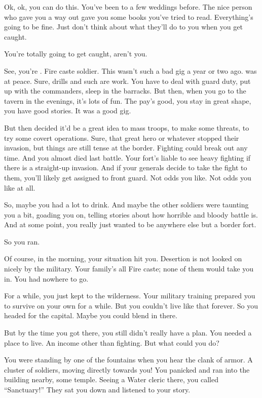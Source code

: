 \documentclass[char]{iron}
\begin{document}
\name{\cFakePriest{}}

Ok, ok, you can do this.  You've been to a few weddings before.  The nice
person who gave you a way out gave you some books you've tried to read.
Everything's going to be fine.  Just don't think about what they'll
do to you when you get caught.

You're totally going to get caught, aren't you.

See, you're \cFakePriest{\real{\full}}.  Fire caste soldier.  This
wasn't such a bad gig a year or two ago.  \sHomeCountry{} was at
peace.  Sure, drills and such are work.  You have to deal with guard
duty, put up with the commanders, sleep in the barracks.  But then,
when you go to the tavern in the evenings, it's lots of fun.  The pay's
good, you stay in great shape, you have good stories.  It was a good
gig.

But then \sMulanCountry{} decided it'd be a great idea to mass troops,
to make some threats, to try some covert operations.  Sure, that great
hero \cMulan{} or whatever stopped their invasion, but things are still
tense at the border.  Fighting could break out any time.  And you almost
died last battle.  Your fort's liable to see heavy fighting if there
is a straight-up invasion.  And if your generals decide to take the fight
to them, you'll likely get assigned to front guard.  Not odds you like.
Not odds you like at all.

So, maybe you had a lot to drink.  And maybe the other soldiers were taunting
you a bit, goading you on, telling stories about how horrible and bloody
battle is.  And at some point, you really just wanted to be anywhere else
but a border fort.

So you ran.

Of course, in the morning, your situation hit you.  Desertion is not looked
on nicely by the military.  Your family's all Fire caste; none of them
would take you in.  You had nowhere to go.

For a while, you just kept to the wilderness.  Your military training prepared
you to survive on your own for a while.  But you couldn't live like that
forever.  So you headed for the capital.  Maybe you could blend in there.

But by the time you got there, you still didn't really have a plan.  You
needed a place to live.  An income other than fighting.  But what could you
do?

You were standing by one of the fountains when you hear the clank of armor.
A cluster of soldiers, moving directly towards you!  You panicked and
ran into the building nearby, some temple.  Seeing a Water cleric there,
you called ``Sanctuary!''  They sat you down and listened to your story.
\end{document}
